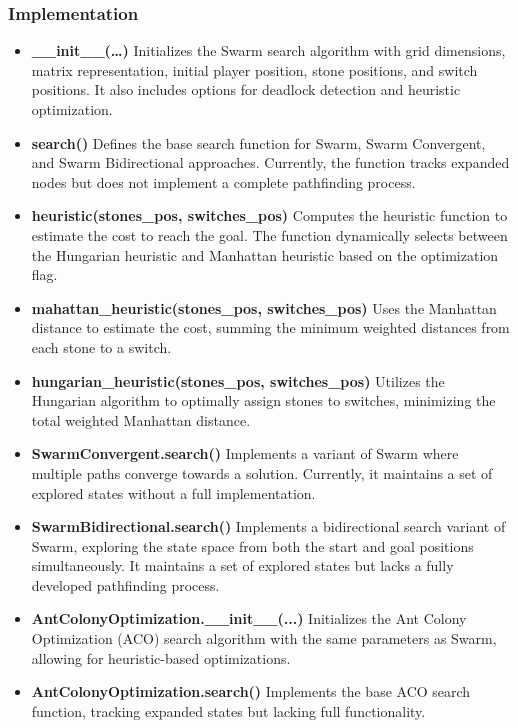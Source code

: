 \subsubsection{Implementation}
\begin{itemize}
    \item \textbf{\_\_init\_\_(\ldots)}
          Initializes the Swarm search algorithm with grid dimensions, matrix representation, initial player position, stone positions, and switch positions. It also includes options for deadlock detection and heuristic optimization.

    \item \textbf{search()}
          Defines the base search function for Swarm, Swarm Convergent, and Swarm Bidirectional approaches. Currently, the function tracks expanded nodes but does not implement a complete pathfinding process.

    \item \textbf{heuristic(stones\_pos, switches\_pos)}
          Computes the heuristic function to estimate the cost to reach the goal. The function dynamically selects between the Hungarian heuristic and Manhattan heuristic based on the optimization flag.

    \item \textbf{mahattan\_heuristic(stones\_pos, switches\_pos)}
          Uses the Manhattan distance to estimate the cost, summing the minimum weighted distances from each stone to a switch.

    \item \textbf{hungarian\_heuristic(stones\_pos, switches\_pos)}
          Utilizes the Hungarian algorithm to optimally assign stones to switches, minimizing the total weighted Manhattan distance.

    \item \textbf{SwarmConvergent.search()}
          Implements a variant of Swarm where multiple paths converge towards a solution. Currently, it maintains a set of explored states without a full implementation.

    \item \textbf{SwarmBidirectional.search()}
          Implements a bidirectional search variant of Swarm, exploring the state space from both the start and goal positions simultaneously. It maintains a set of explored states but lacks a fully developed pathfinding process.

    \item \textbf{AntColonyOptimization.\_\_init\_\_(...)}
          Initializes the Ant Colony Optimization (ACO) search algorithm with the same parameters as Swarm, allowing for heuristic-based optimizations.

    \item \textbf{AntColonyOptimization.search()}
          Implements the base ACO search function, tracking expanded states but lacking full functionality.
\end{itemize}

